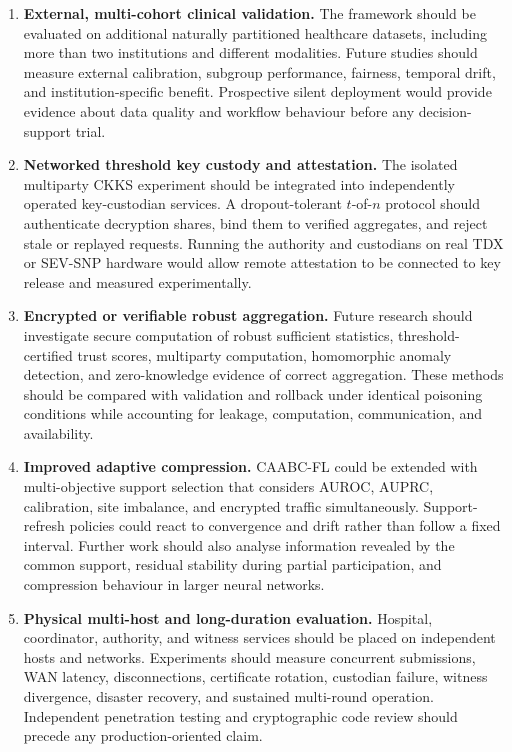 \begin{enumerate}
    \item \textbf{External, multi-cohort clinical validation.} The framework should be evaluated on additional naturally partitioned healthcare datasets, including more than two institutions and different modalities. Future studies should measure external calibration, subgroup performance, fairness, temporal drift, and institution-specific benefit. Prospective silent deployment would provide evidence about data quality and workflow behaviour before any decision-support trial.

    \item \textbf{Networked threshold key custody and attestation.} The isolated multiparty CKKS experiment should be integrated into independently operated key-custodian services. A dropout-tolerant $t$-of-$n$ protocol should authenticate decryption shares, bind them to verified aggregates, and reject stale or replayed requests. Running the authority and custodians on real TDX or SEV-SNP hardware would allow remote attestation to be connected to key release and measured experimentally.

    \item \textbf{Encrypted or verifiable robust aggregation.} Future research should investigate secure computation of robust sufficient statistics, threshold-certified trust scores, multiparty computation, homomorphic anomaly detection, and zero-knowledge evidence of correct aggregation. These methods should be compared with validation and rollback under identical poisoning conditions while accounting for leakage, computation, communication, and availability.

    \item \textbf{Improved adaptive compression.} CAABC-FL could be extended with multi-objective support selection that considers AUROC, AUPRC, calibration, site imbalance, and encrypted traffic simultaneously. Support-refresh policies could react to convergence and drift rather than follow a fixed interval. Further work should also analyse information revealed by the common support, residual stability during partial participation, and compression behaviour in larger neural networks.

    \item \textbf{Physical multi-host and long-duration evaluation.} Hospital, coordinator, authority, and witness services should be placed on independent hosts and networks. Experiments should measure concurrent submissions, WAN latency, disconnections, certificate rotation, custodian failure, witness divergence, disaster recovery, and sustained multi-round operation. Independent penetration testing and cryptographic code review should precede any production-oriented claim.


\end{enumerate}
